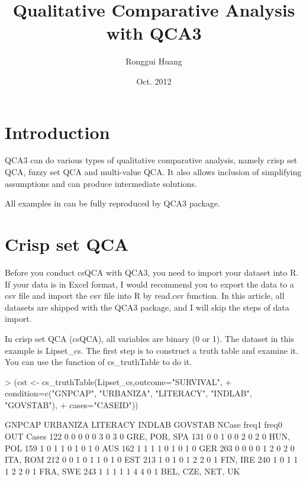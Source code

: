 \documentclass[a4paper]{article}
\begin{document}


\title{Qualitative Comparative Analysis with QCA3}
\author{Ronggui Huang}
\date{Oct. 2012}
\maketitle

\section{Introduction}
QCA3 can do various types of qualitative comparative analysis, namely
crisp set QCA, fuzzy set QCA and multi-value QCA.
It also allows inclusion of simplifying assumptions and can produce
intermediate solutions.

All examples in \cite{RihouxRagin2009} can be fully reproduced by QCA3 package.

\section{Crisp set QCA}

Before you conduct csQCA with QCA3, you need to import your dataset into R. If
your data is in Excel format, I would recommend you to export the data
to a csv file and import the csv file into R by read.csv function. In
this article, all datasets are shipped with the QCA3 package, and I
will skip the steps of data import.

In crisp set QCA (csQCA), all variables are binary (0 or
1). The dataset in this example is Lipset_cs. The first step is to
construct a truth table and examine it. You can use the function of
cs_truthTable to do it.

\begin{Schunk}
\begin{Sinput}
> (cst <- cs_truthTable(Lipset_cs,outcome="SURVIVAL",
+                       condition=c("GNPCAP", "URBANIZA", "LITERACY", "INDLAB", "GOVSTAB"),
+                       cases="CASEID"))
\end{Sinput}
\begin{Soutput}
    GNPCAP URBANIZA LITERACY INDLAB GOVSTAB NCase freq1 freq0 OUT             Cases
122      0        0        0      0       0     3     0     3   0     GRE, POR, SPA
131      0        0        1      0       0     2     0     2   0          HUN, POL
159      1        0        1      1       0     1     0     1   0               AUS
162      1        1        1      1       0     1     0     1   0               GER
203      0        0        0      0       1     2     0     2   0          ITA, ROM
212      0        0        1      0       1     1     0     1   0               EST
213      1        0        1      0       1     2     2     0   1          FIN, IRE
240      1        0        1      1       1     2     2     0   1          FRA, SWE
243      1        1        1      1       1     4     4     0   1 BEL, CZE, NET, UK
\end{Soutput}
\end{Schunk}
\end{document}
